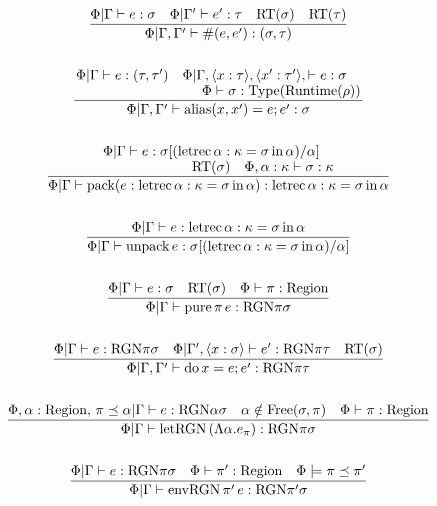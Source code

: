\documentclass {article}
\begin{document}
\begin{gather*}
\frac
{\Phi | \Gamma \vdash e : \sigma \quad \Phi | \Gamma' \vdash e' : \tau \quad \text{RT}(\sigma) \quad \text{RT}(\tau) }
{\Phi | \Gamma, \Gamma' \vdash \#(e, e') : (\sigma, \tau) } \\
\\
\frac
{\splitfrac{\Phi | \Gamma \vdash e : (\tau, \tau') \quad \Phi | \Gamma , \langle x : \tau \rangle, \langle x' : \tau' \rangle,  \vdash e : \sigma  }
{\Phi \vdash \sigma : \text{Type} (\text{Runtime} (\rho)) }}
{\Phi | \Gamma, \Gamma' \vdash \text{alias} (x, x') = e; e' : \sigma} \\
\\
\frac
{\splitfrac{\Phi | \Gamma \vdash e :  \sigma [(\text{letrec} \, \alpha : \kappa = \sigma \, \text{in} \, \alpha) / \alpha]}
{\text{RT}(\sigma) \quad \Phi, \alpha : \kappa \vdash \sigma : \kappa}}
{\Phi | \Gamma \vdash \text{pack} (e : \text{letrec} \, \alpha : \kappa = \sigma \, \text{in} \, \alpha) : \text{letrec} \, \alpha : \kappa = \sigma \, \text{in} \, \alpha} \\
\\
\frac
{\Phi | \Gamma \vdash e : \text{letrec} \, \alpha : \kappa = \sigma \, \text{in} \, \alpha }
{\Phi | \Gamma \vdash \text{unpack} \, e : \sigma [(\text{letrec} \, \alpha : \kappa = \sigma \, \text{in} \, \alpha) /\alpha]} \\
\\
\frac
{\Phi | \Gamma \vdash e : \sigma \quad \text{RT}(\sigma) \quad \Phi \vdash \pi : \text{Region} }
{\Phi | \Gamma \vdash \text{pure} \, \pi \, e : \text{RGN} \pi \sigma } \\
\\
\frac
{\Phi | \Gamma \vdash e : \text{RGN} \pi \sigma \quad \Phi | \Gamma', \langle x : \sigma \rangle \vdash e' : \text{RGN} \pi \tau \quad \text{RT}(\sigma) }
{\Phi | \Gamma, \Gamma' \vdash \text{do} \, x = e; e' : \text{RGN} \pi \tau} \\
\\
\frac
{\Phi , \alpha : \text{Region}, \,  \pi \preceq \alpha | \Gamma \vdash e : \text{RGN} \alpha \sigma \quad \alpha \notin \text{Free}(\sigma, \pi) \quad \Phi \vdash \pi : \text{Region}}
{\Phi | \Gamma \vdash \text{letRGN} \, (\Lambda \alpha. e_\pi) : \text{RGN} \pi \sigma} \\
\\
\frac
{\Phi | \Gamma \vdash e : \text{RGN} \pi \sigma \quad \Phi \vdash \pi' : \text{Region} \quad \Phi \models \pi \preceq \pi'}
{\Phi | \Gamma \vdash \text{envRGN} \, \pi' \, e : \text{RGN} \pi' \sigma } \\

\end{gather*}
\end{document}
